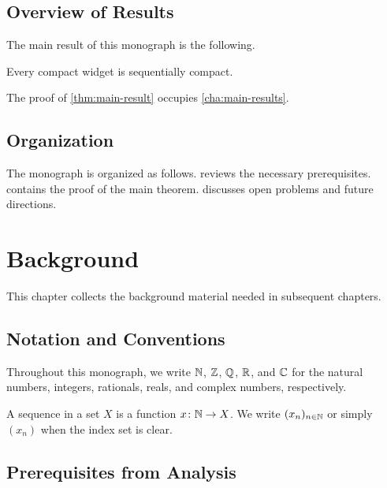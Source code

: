 \documentclass[letterpaper,12pt,oneside,openany]{memoir}
\begin{document}
\section{Overview of Results}\label{sec:overview-results}

The main result of this monograph is the following.

\begin{theorem}\label{thm:main-result}
  Every compact widget is sequentially compact.
\end{theorem}

The proof of \cref{thm:main-result} occupies \cref{cha:main-results}.

\section{Organization}\label{sec:organization}

The monograph is organized as follows.
 reviews the necessary prerequisites.
 contains the proof of the main theorem.
 discusses open problems and future directions.
\chapter{Background}\label{cha:background}

This chapter collects the background material needed in subsequent chapters.

\section{Notation and Conventions}\label{sec:notation}

Throughout this monograph, we write $\mathbb{N}$, $\mathbb{Z}$, $\mathbb{Q}$, $\mathbb{R}$, and $\mathbb{C}$
for the natural numbers, integers, rationals, reals, and complex numbers,
respectively.

\begin{notation}\label{notn:sequences}
  A sequence in a set $X$ is a function $x \colon \mathbb{N} \to X$.
  We write $(x_n)_{n \in \mathbb{N}}$ or simply $(x_n)$ when the index set is clear.
\end{notation}

\section{Prerequisites from Analysis}\label{sec:prerequisites-analysis}
\end{document}
